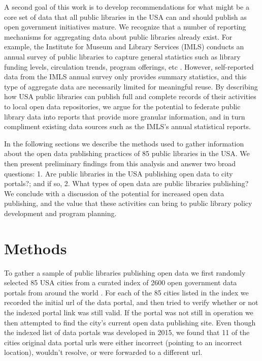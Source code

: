 \documentclass[sigconf]{acmart}
\begin{document}
A second goal of this work is to develop recommendations for what might be a core set of data that all public libraries in the USA can and should publish as open government initiatives mature. We recognize that a number of reporting mechanisms for aggregating data about public libraries already exist. For example, the Institute for Museum and Library Services (IMLS) conducts an annual survey of public libraries to capture general statistics such as library funding levels, circulation trends, program offerings, etc \cite{plsreport2016}. However,  self-reported data from the IMLS annual survey only provides summary statistics, and this type of aggregate data are necessarily limited for meaningful reuse. By describing how USA public libraries can publish full and complete records of their activities to local open data repositories, we argue for the potential to federate public library data into reports that provide more granular information, and in turn compliment existing data sources such as the IMLS's annual statistical reports.

In the following sections we describe the methods used to gather information about the open data publishing practices of 85 public libraries in the USA. We then present preliminary findings from this analysis and answer two broad questions: 1. Are public libraries in the USA publishing open data to city portals?; and if so, 2. What types of open data are public libraries publishing? We conclude with a discussion of the potential for increased open data publishing, and the value that these activities can bring to public library policy development and program planning.

\section{Methods}
To gather a sample of public libraries publishing open data we first randomly selected 85 USA cities from a curated index of 2600 open government data portals from around the world \cite{mercier_we_2015}. For each of the 85 cities listed in the index we recorded the initial url of the data portal, and then tried to verify whether or not the indexed portal link was still valid. If the portal was not still in operation we then attempted to find the city's current open data publishing site. Even though the indexed list of data portals was developed in 2015, we found that 11 of the cities original data portal urls were either incorrect (pointing to an incorrect location), wouldn't resolve, or were forwarded to a different url.
\end{document}
